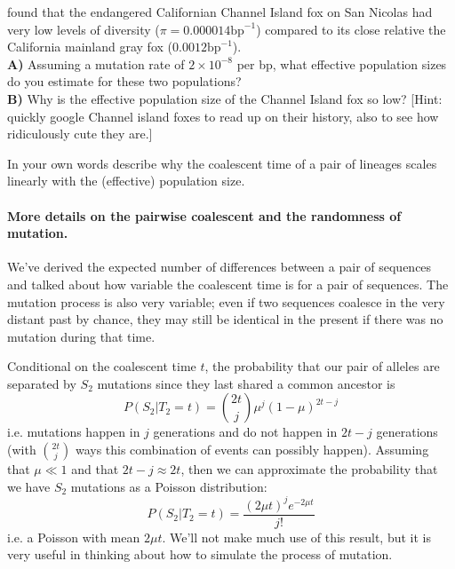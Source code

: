 \begin{question}
\citet{robinson:16} found that the endangered Californian Channel Island fox on San Nicolas had very
low levels of diversity ($\pi =0.000014 \text{bp}^{-1}$) compared to
its close relative the California mainland gray fox ($0.0012\text{bp}^{-1}$). \\
{\bf A)} Assuming a mutation rate of $2\times 10^{-8}$ per bp, what
effective population sizes do you estimate for these two populations?
\\
{\bf B)} Why is the effective population size of the Channel Island fox
so low? [Hint: quickly google Channel island foxes to read up on their
history, also to see how ridiculously cute they are.]
\end{question}


\begin{question}
In your own words describe why the coalescent time of a pair of lineages scales linearly with the (effective) population size.
\end{question}


\paragraph{More details on the pairwise coalescent and the randomness of mutation.}

We've derived the expected number of differences between a pair of sequences and talked about how variable the coalescent time is for a pair of sequences. The mutation process is also very variable; even if two sequences coalesce in the very distant past by chance, they may still be identical in the present if there was no mutation during that time. 

Conditional on the coalescent time $t$, the probability that our pair of alleles are separated by $S_2$ mutations since they last shared a common ancestor is
\begin{equation}
P(S_2 | T_2 = t ) = {2t \choose j} \mu^{j} (1-\mu)^{2t-j}
\end{equation}
i.e. mutations happen in $j$ generations and do not happen in $2t-j$
generations (with ${2t \choose j}$ ways this combination of events can possibly
happen). Assuming that $\mu \ll 1$ and that $2t-j \approx 2t$, then we
can approximate the probability that we have $S_2$ mutations as a
Poisson distribution:
\begin{equation}
P(S_2 | T_2 = t ) = \frac{ (2 \mu t )^{j} e^{-2\mu t}}{j!}
\end{equation}
i.e. a Poisson with mean $2\mu t $. We'll not make much use of this result, but it is very useful in thinking about how to simulate the process of mutation.\\

